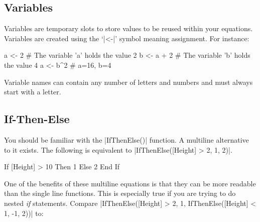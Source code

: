 \documentclass[]{memoir}
\newenvironment{Shaded}{}{}
\newcommand{\DecValTok}[1]{\textcolor[rgb]{0.25,0.63,0.44}{{#1}}}
\newcommand{\StringTok}[1]{\textcolor[rgb]{0.25,0.44,0.63}{{#1}}}
\newcommand{\FunctionTok}[1]{\textcolor[rgb]{0.02,0.16,0.49}{{#1}}}
\newcommand{\NormalTok}[1]{{#1}}
\begin{document}
\subsection{Variables}

Variables are temporary slots to store values to be reused within your
equations. Variables are created using the `|\NormalTok{<-}|' symbol
meaning assignment. For instance:

\begin{Shaded}
\begin{Highlighting}[]
\NormalTok{a <- }\DecValTok{2} \NormalTok{# The variable }\StringTok{'a'} \NormalTok{holds the value }\DecValTok{2}
\NormalTok{b <- a + }\DecValTok{2} \NormalTok{# The variable }\StringTok{'b'} \NormalTok{holds the value }\DecValTok{4}
\NormalTok{a <- b^}\DecValTok{2} \NormalTok{# a=}\DecValTok{16}\NormalTok{, b=}\DecValTok{4}
\end{Highlighting}
\end{Shaded}

Variable names can contain any number of letters and numbers and must
always start with a letter.

\subsection{If-Then-Else}

You should be familiar with the |\FunctionTok{IfThenElse}\NormalTok{()}|
function. A multiline alternative to it exists. The following is
equivalent to
|\FunctionTok{IfThenElse}\NormalTok{([Height] > }\DecValTok{2}\NormalTok{, }\DecValTok{1}\NormalTok{, }\DecValTok{2}\NormalTok{)}|.

\begin{Shaded}
\begin{Highlighting}[]
\NormalTok{If [Height] > }\DecValTok{10} \NormalTok{Then}
    \DecValTok{1}
\NormalTok{Else}
    \DecValTok{2}
\NormalTok{End If}
\end{Highlighting}
\end{Shaded}

One of the benefits of these multiline equations is that they can be
more readable than the single line functions. This is especially true if
you are trying to do nested \emph{if} statements. Compare
|\FunctionTok{IfThenElse}\NormalTok{([Height] > }\DecValTok{2}\NormalTok{, }\DecValTok{1}\NormalTok{, }\FunctionTok{IfThenElse}\NormalTok{([Height] < }\DecValTok{1}\NormalTok{, -}\DecValTok{1}\NormalTok{, }\DecValTok{2}\NormalTok{))}|
to:
\end{document}

